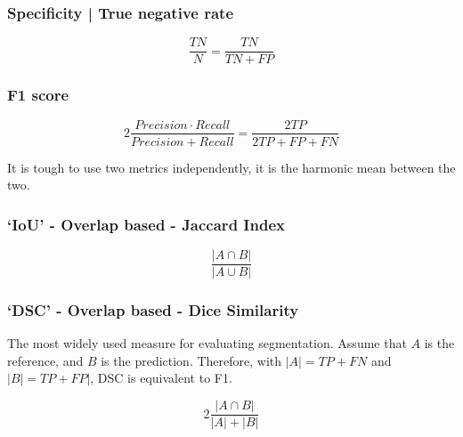 \documentclass[11pt]{article}
\begin{document}
\subsubsection{Specificity | True negative rate}

\begin{definition}[Specificity]
    \begin{equation*}
        \frac{TN}{N} = \frac{TN}{TN + FP} 
    \end{equation*}
\end{definition}

\subsubsection{F1 score}

\begin{definition}[F1 score]
    \begin{equation*}
        2\frac{Precision \cdot Recall}{Precision + Recall} = \frac{2TP}{2TP + FP + FN}
    \end{equation*}
\end{definition}

It is tough to use two metrics independently, it is the harmonic mean between the two.

\subsubsection{`IoU' - Overlap based - Jaccard Index}

\begin{definition}
    \begin{equation*}
        \frac{|A\cap B|}{|A \cup B|}
    \end{equation*}
\end{definition}

\subsubsection{`DSC' - Overlap based - Dice Similarity}

The most widely used measure for evaluating segmentation. Assume that $A$ is the reference, and $B$ is the prediction. Therefore, with $|A| = TP + FN$ and $|B| = TP + FP|$, DSC is equivalent to F1.

\begin{definition}[DICE]
    \begin{equation*}
        2\frac{|A\cap B|}{|A|+|B|}
    \end{equation*}
\end{definition}
\end{document}
